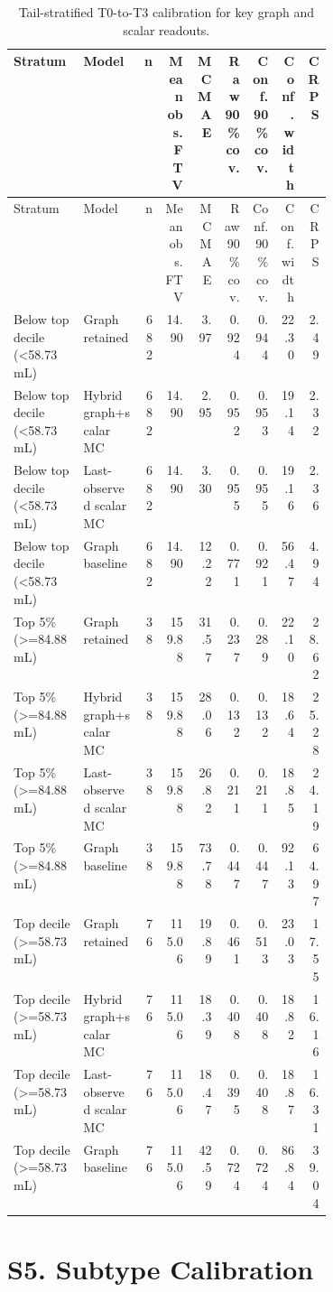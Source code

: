 \documentclass[10pt]{article}
\begin{document}
\small
\setlength{\tabcolsep}{3pt}
\renewcommand{\arraystretch}{1.08}
\begin{longtable}{@{}L{0.22\linewidth}L{0.19\linewidth}rrrrrrr@{}}
\caption{Tail-stratified T0-to-T3 calibration for key graph and scalar readouts.}\label{tab:s-burden-tail}\\
\toprule
Stratum & Model & n & Mean obs. FTV & MC MAE & Raw 90\% cov. & Conf. 90\% cov. & Conf. width & CRPS \\
\midrule
\endfirsthead
\toprule
Stratum & Model & n & Mean obs. FTV & MC MAE & Raw 90\% cov. & Conf. 90\% cov. & Conf. width & CRPS \\
\midrule
\endhead
Below top decile (<58.73 mL) & Graph retained & 682 & 14.90 & 3.97 & 0.924 & 0.944 & 22.30 & 2.49 \\
Below top decile (<58.73 mL) & Hybrid graph+scalar MC & 682 & 14.90 & 2.95 & 0.952 & 0.953 & 19.14 & 2.32 \\
Below top decile (<58.73 mL) & Last-observed scalar MC & 682 & 14.90 & 3.30 & 0.955 & 0.955 & 19.16 & 2.36 \\
Below top decile (<58.73 mL) & Graph baseline & 682 & 14.90 & 12.22 & 0.771 & 0.921 & 56.47 & 4.94 \\
Top 5\% (>=84.88 mL) & Graph retained & 38 & 159.88 & 31.57 & 0.237 & 0.289 & 22.10 & 28.62 \\
Top 5\% (>=84.88 mL) & Hybrid graph+scalar MC & 38 & 159.88 & 28.06 & 0.132 & 0.132 & 18.64 & 25.28 \\
Top 5\% (>=84.88 mL) & Last-observed scalar MC & 38 & 159.88 & 26.82 & 0.211 & 0.211 & 18.85 & 24.19 \\
Top 5\% (>=84.88 mL) & Graph baseline & 38 & 159.88 & 73.78 & 0.447 & 0.447 & 92.13 & 64.97 \\
Top decile (>=58.73 mL) & Graph retained & 76 & 115.06 & 19.89 & 0.461 & 0.513 & 23.03 & 17.55 \\
Top decile (>=58.73 mL) & Hybrid graph+scalar MC & 76 & 115.06 & 18.39 & 0.408 & 0.408 & 18.82 & 16.16 \\
Top decile (>=58.73 mL) & Last-observed scalar MC & 76 & 115.06 & 18.47 & 0.395 & 0.408 & 18.87 & 16.31 \\
Top decile (>=58.73 mL) & Graph baseline & 76 & 115.06 & 42.59 & 0.724 & 0.724 & 86.84 & 39.04 \\
\bottomrule
\end{longtable}
\normalsize

\clearpage
\section*{S5. Subtype Calibration}
\end{document}
